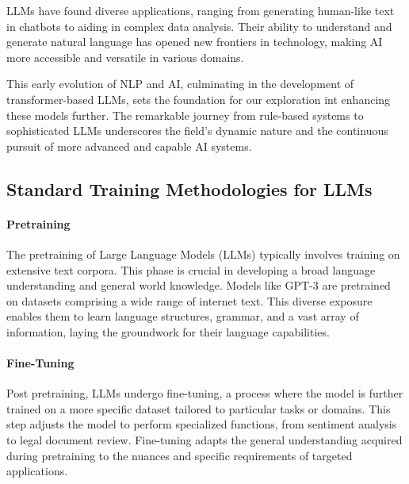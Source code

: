 \documentclass[
]{article}
\begin{document}
LLMs have found diverse applications, ranging from generating human-like
text in chatbots to aiding in complex data analysis. Their ability to
understand and generate natural language has opened new frontiers in
technology, making AI more accessible and versatile in various domains.

This early evolution of NLP and AI, culminating in the development of
transformer-based LLMs, sets the foundation for our exploration int
enhancing these models further. The remarkable journey from rule-based
systems to sophisticated LLMs underscores the field's dynamic nature and
the continuous pursuit of more advanced and capable AI systems.

\hypertarget{standard-training-methodologies-for-llms}{%
\subsection{Standard Training Methodologies for
LLMs}\label{standard-training-methodologies-for-llms}}

\hypertarget{pretraining}{%
\paragraph*{Pretraining}\label{pretraining}}

The pretraining of Large Language Models (LLMs) typically involves
training on extensive text corpora. This phase is crucial in developing
a broad language understanding and general world knowledge. Models like
GPT-3 are pretrained on datasets comprising a wide range of internet
text. This diverse exposure enables them to learn language structures,
grammar, and a vast array of information, laying the groundwork for
their language capabilities.

\hypertarget{fine-tuning}{%
\paragraph*{Fine-Tuning}\label{fine-tuning}}

Post pretraining, LLMs undergo fine-tuning, a process where the model is
further trained on a more specific dataset tailored to particular tasks
or domains. This step adjusts the model to perform specialized
functions, from sentiment analysis to legal document review. Fine-tuning
adapts the general understanding acquired during pretraining to the
nuances and specific requirements of targeted applications.
\end{document}
